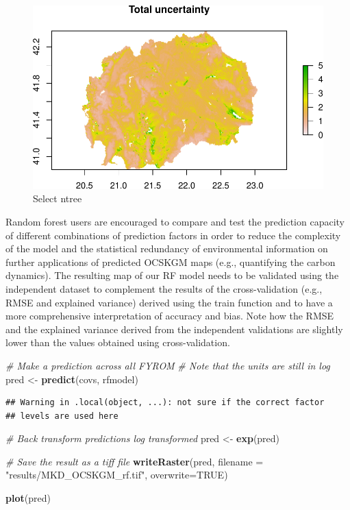 \documentclass[10pt,b5paper,]{book}
\newenvironment{Shaded}{\begin{snugshade}}{\end{snugshade}}
\newcommand{\CommentTok}[1]{\textcolor[rgb]{0.56,0.35,0.01}{\textit{#1}}}
\newcommand{\DataTypeTok}[1]{\textcolor[rgb]{0.13,0.29,0.53}{#1}}
\newcommand{\KeywordTok}[1]{\textcolor[rgb]{0.13,0.29,0.53}{\textbf{#1}}}
\newcommand{\NormalTok}[1]{#1}
\newcommand{\OtherTok}[1]{\textcolor[rgb]{0.56,0.35,0.01}{#1}}
\newcommand{\StringTok}[1]{\textcolor[rgb]{0.31,0.60,0.02}{#1}}
\theoremstyle{definition}
\theoremstyle{definition}
\theoremstyle{definition}
\theoremstyle{remark}
\begin{document}
\begin{figure}
\centering
\includegraphics{SOCMapping_files/figure-latex/unnamed-chunk-63-1.pdf}
\caption{\label{fig:unnamed-chunk-63}Select ntree}
\end{figure}

Random forest users are encouraged to compare and test the prediction
capacity of different combinations of prediction factors in order to
reduce the complexity of the model and the statistical redundancy of
environmental information on further applications of predicted OCSKGM
maps (e.g., quantifying the carbon dynamics). The resulting map of our
RF model needs to be validated using the independent dataset to
complement the results of the cross-validation (e.g., RMSE and explained
variance) derived using the train function and to have a more
comprehensive interpretation of accuracy and bias. Note how the RMSE and
the explained variance derived from the independent validations are
slightly lower than the values obtained using cross-validation.

\begin{Shaded}
\begin{Highlighting}[]
\CommentTok{# Make a prediction across all FYROM}
\CommentTok{# Note that the units are still in log}
\NormalTok{pred <-}\StringTok{ }\KeywordTok{predict}\NormalTok{(covs, rfmodel)}
\end{Highlighting}
\end{Shaded}

\begin{verbatim}
## Warning in .local(object, ...): not sure if the correct factor
## levels are used here
\end{verbatim}

\begin{Shaded}
\begin{Highlighting}[]
\CommentTok{# Back transform predictions log transformed}
\NormalTok{pred <-}\StringTok{ }\KeywordTok{exp}\NormalTok{(pred)}

\CommentTok{# Save the result as a tiff file}
\KeywordTok{writeRaster}\NormalTok{(pred, }\DataTypeTok{filename =} \StringTok{"results/MKD_OCSKGM_rf.tif"}\NormalTok{,}
            \DataTypeTok{overwrite=}\OtherTok{TRUE}\NormalTok{)}

\KeywordTok{plot}\NormalTok{(pred)}
\end{Highlighting}
\end{Shaded}
\end{document}
